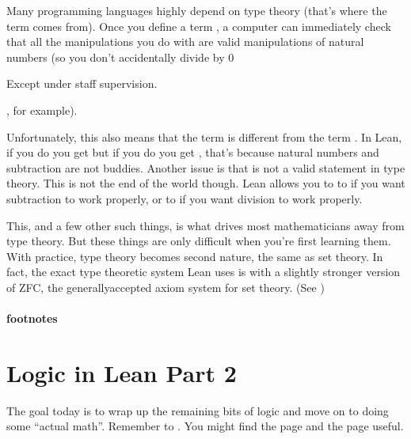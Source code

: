\documentclass[letterpaper,10pt,english]{sphinxmanual}
\begin{document}
\sphinxAtStartPar
Many programming languages highly depend on type theory (that’s where the term  comes from).
Once you define a term , a computer can immediately check that all the manipulations you do with 
are valid manipulations of natural numbers (so you don’t accidentally divide by 0 %
\begin{footnote}[1]\sphinxAtStartFootnote
Except under staff supervision.
%
\end{footnote} , for example).

\sphinxAtStartPar
Unfortunately, this also means that the term  is different from the term .
In Lean, if you do  you get  but if you do  you get ,
that’s because natural numbers and subtraction are not buddies.
Another issue is that  is not a valid statement in type theory.
This is not the end of the world though.
Lean allows you to   to  if you want subtraction to work properly,
or  to  if you want division to work properly.

\sphinxAtStartPar
This, and a few other such things, is what drives most mathematicians away from type theory.
But these things are only difficult when you’re first learning them.
With practice, type theory becomes second nature, the same as set theory.
In fact, the exact type theoretic system Lean uses is   with a slightly stronger version of ZFC, the generally\sphinxhyphen{}accepted axiom system for set theory.
(See )
\subsubsection*{footnotes}

\sphinxstepscope


\chapter{Logic in Lean \sphinxhyphen{} Part 2}
\label{\detokenize{day2:logic-in-lean-part-2}}\label{\detokenize{day2:day2}}\label{\detokenize{day2::doc}}
\sphinxAtStartPar
The goal today is to wrap up the remaining bits of logic and move on to doing some “actual math”.
Remember to .
You might find the {\hyperref[\detokenize{tactics::doc}]{}} page and the {\hyperref[\detokenize{symbols::doc}]{}} page useful.
\end{document}
